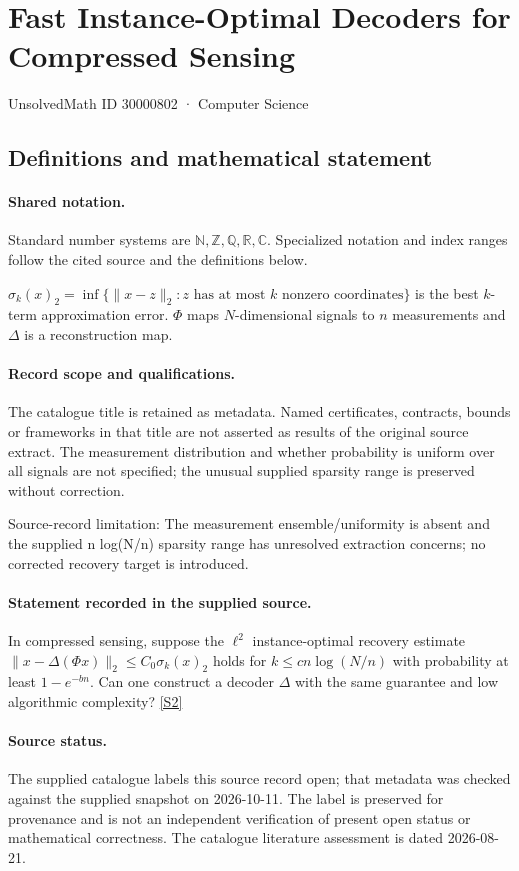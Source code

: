 \documentclass[11pt]{article}
\newcommand{\sref}[2]{\hyperlink{source:#1:#2}{[S#2]}}
\begin{document}
\setcounter{section}{30000801}
\section{Fast Instance-Optimal Decoders for Compressed Sensing}\label{30000802}
{\small\sffamily UnsolvedMath ID 30000802 · Computer Science}
\subsection{Definitions and mathematical statement}

\paragraph{Shared notation.}Standard number systems are $\mathbb N,\mathbb Z,\mathbb Q,\mathbb R,\mathbb C$. Specialized notation and index ranges follow the cited source and the definitions below.


$\sigma_k(x)_2=\inf\{\lVert x-z\rVert_2:z\text{ has at most }k\text{ nonzero coordinates}\}$ is the best $k$-term approximation error. $\Phi$ maps $N$-dimensional signals to $n$ measurements and $\Delta$ is a reconstruction map.
\paragraph{Record scope and qualifications.}
The catalogue title is retained as metadata. Named certificates, contracts, bounds or frameworks in that title are not asserted as results of the original source extract.
The measurement distribution and whether probability is uniform over all signals are not specified; the unusual supplied sparsity range is preserved without correction.

Source-record limitation: The measurement ensemble/uniformity is absent and the supplied n log(N/n) sparsity range has unresolved extraction concerns; no corrected recovery target is introduced.
\paragraph{Statement recorded in the supplied source.}
In compressed sensing, suppose the $\ell^2$ instance-optimal recovery estimate $\lVert x-\Delta(\Phi x)\rVert_2\leq C_0\sigma_k(x)_2$ holds for $k\leq cn\log(N/n)$ with probability at least $1-e^{-bn}$. Can one construct a decoder $\Delta$ with the same guarantee and low algorithmic complexity? \sref{30000802}{2}
\paragraph{Source status.}
The supplied catalogue labels this source record open; that metadata was checked against the supplied snapshot on 2026-10-11. The label is preserved for provenance and is not an independent verification of present open status or mathematical correctness. The catalogue literature assessment is dated 2026-08-21.
\end{document}
